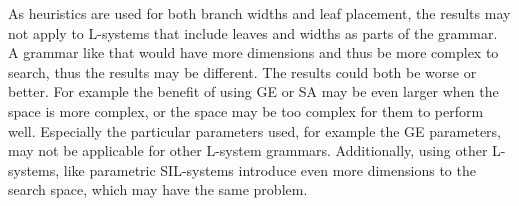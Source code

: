 As heuristics are used for both branch widths and leaf placement, the results may not apply to L-systems that include leaves and widths as parts of the grammar.
A grammar like that would have more dimensions and thus be more complex to search, thus the results may be different.
The results could both be worse or better.
For example the benefit of using GE or SA may be even larger when the space is more complex, or the space may be too complex for them to perform well.
Especially the particular parameters used, for example the GE parameters, may not be applicable for other L-system grammars.
Additionally, using other L-systems, like parametric SIL-systems introduce even more dimensions to the search space, which may have the same problem.

